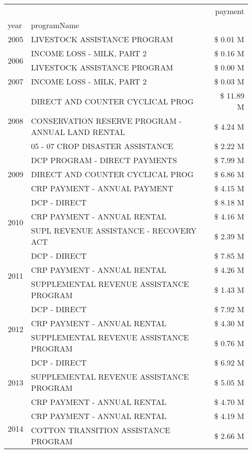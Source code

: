 \begin{tabular}{llr}
\toprule
 &  & payment \\
year & programName &  \\
\midrule
2005 & LIVESTOCK ASSISTANCE PROGRAM & \$ 0.01 M \\
\cline{1-3}
\multirow[t]{2}{*}{2006} & INCOME LOSS - MILK, PART 2 & \$ 0.16 M \\
 & LIVESTOCK ASSISTANCE PROGRAM & \$ 0.00 M \\
\cline{1-3}
2007 & INCOME LOSS - MILK, PART 2 & \$ 0.03 M \\
\cline{1-3}
\multirow[t]{3}{*}{2008} & DIRECT AND COUNTER CYCLICAL PROG & \$ 11.89 M \\
 & CONSERVATION RESERVE PROGRAM - ANNUAL LAND RENTAL & \$ 4.24 M \\
 & 05 - 07 CROP DISASTER ASSISTANCE & \$ 2.22 M \\
\cline{1-3}
\multirow[t]{3}{*}{2009} & DCP PROGRAM - DIRECT PAYMENTS & \$ 7.99 M \\
 & DIRECT AND COUNTER CYCLICAL PROG & \$ 6.86 M \\
 & CRP PAYMENT - ANNUAL PAYMENT & \$ 4.15 M \\
\cline{1-3}
\multirow[t]{3}{*}{2010} & DCP - DIRECT & \$ 8.18 M \\
 & CRP PAYMENT - ANNUAL RENTAL & \$ 4.16 M \\
 & SUPL REVENUE ASSISTANCE - RECOVERY ACT & \$ 2.39 M \\
\cline{1-3}
\multirow[t]{3}{*}{2011} & DCP - DIRECT & \$ 7.85 M \\
 & CRP PAYMENT - ANNUAL RENTAL & \$ 4.26 M \\
 & SUPPLEMENTAL REVENUE ASSISTANCE PROGRAM & \$ 1.43 M \\
\cline{1-3}
\multirow[t]{3}{*}{2012} & DCP - DIRECT & \$ 7.92 M \\
 & CRP PAYMENT - ANNUAL RENTAL & \$ 4.30 M \\
 & SUPPLEMENTAL REVENUE ASSISTANCE PROGRAM & \$ 0.76 M \\
\cline{1-3}
\multirow[t]{3}{*}{2013} & DCP - DIRECT & \$ 6.92 M \\
 & SUPPLEMENTAL REVENUE ASSISTANCE PROGRAM & \$ 5.05 M \\
 & CRP PAYMENT - ANNUAL RENTAL & \$ 4.70 M \\
\cline{1-3}
\multirow[t]{3}{*}{2014} & CRP PAYMENT - ANNUAL RENTAL & \$ 4.19 M \\
 & COTTON TRANSITION ASSISTANCE PROGRAM & \$ 2.66 M \\

\end{tabular}

